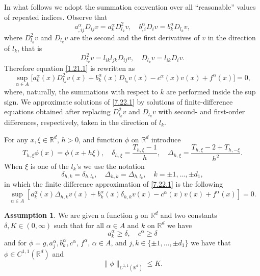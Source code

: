 \documentclass[11pt, reqno]{amsart}
\theoremstyle{definition}
\newtheorem{assumption}{Assumption}[section]
\theoremstyle{remark}
\begin{document}
In what follows we adopt the summation convention
over all ``reasonable'' values of repeated indices.
Observe that
$$
a^{\alpha}_{, ij}D_{ij}v=a^{\alpha}_{k}D^{2}_{l_{k}}v,\quad
b^{\alpha}_{ , i}D_{i}v=b^{\alpha}_{k}D_{l_{k}}v,
$$
where $D^{2}_{l_{k}}v$ and $D_{l_{k}}v$ are the second
and the first derivatives of $v$ in the direction of
 $l_{k}$, that is 
$$
D^{2}_{l_{k}}v=l_{ik} l_{jk} D_{ij}v,\quad
D_{l_{k}}v=l_{ik} D_{i}v.
$$
Therefore equation \eqref{1.21.1} is rewritten as
\begin{equation}
                                              \label{7.22.1}
\sup_{\alpha\in A}\big[ 
 a^{\alpha}_{k}(x)D^{2}_{l_{k}}v(x)+
b^{\alpha}_{k}(x)D _{l_{k}}v(x)
-c^{\alpha}( x)v(x)+f^{\alpha}( x) ]=0,
\end{equation}
where, naturally, the summations with respect to $k$
are performed inside the sup sign.
We  approximate solutions of
\eqref{7.22.1} by solutions of finite-difference
equations obtained after replacing $D^{2}_{l_{k}}v$
and $D _{l_{k}}v$ with second- and first-order
differences, respectively, taken in the direction of $l_{k}$.

For any $x,\xi\in{\mathbb{R}}^{d}$,
$h>0$, and function $\phi$ on ${\mathbb{R}}^{d}$ introduce
$$
T_{h,\xi}\phi(x)=\phi(x+h\xi),\quad\delta_{h,\xi}
=\frac{ T_{h,\xi}-1}{h},\quad \Delta_{h,\xi}=\frac{T_{h,\xi}
-2+T_{h,-\xi}}{h^{2}}.
$$
When $\xi$ is one of the $l_{k}$'s we use the notation
$$
\delta_{h,k}=\delta_{h,l_{k}}, \quad
\Delta_{h,k}=\Delta_{h,l_{k}}, \quad
k=\pm1,...,\pm d_{1},
$$
in which the  finite difference approximation of \eqref{7.22.1}
is the following
\begin{equation}
                                                    \label{10.26.1}
\sup_{\alpha\in A} 
 [a_{k}^{\alpha}( x)\Delta_{h,k}v(x)
+b_{k}^{\alpha}( x)\delta_{h,k}v(x) 
-c^{\alpha}( x)v(x)+f^{\alpha}( x) ]=0.
\end{equation}

\begin{assumption}
                                         \label{assumption 12.17.2}
We are given a function $g$ on ${\mathbb{R}}^{d}$
and two constants $\delta,
K\in(0,\infty)$ 
such that for all $\alpha\in A$ and $k$ on ${\mathbb{R}}^{d}$ we have
$$
a^{\alpha}_{k}\geq\delta  ,\quad
c^{\alpha}\geq\delta
$$
and for $\phi=g,a^{\alpha}_{j},b^{\alpha}_{k},c^{\alpha}$,
$f^{\alpha}$,
$\alpha\in A$, and $ j,k\in\{\pm 1,...,\pm d_{1}\}$
we have that $\phi\in C^{1,1}({\mathbb{R}}^{d})$  and 
$$
\|\phi\|_{C^{1,1}({\mathbb{R}}^{d})}\leq K.
$$

\end{assumption}
\end{document}
